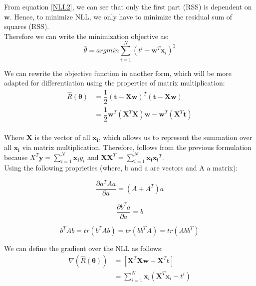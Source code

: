 \documentclass[reqno]{amsart}
\theoremstyle{definition}
\theoremstyle{remark}
\numberwithin{equation}{section}
\begin{document}
From equation \ref{NLL2}, we can see that only the first part (RSS) is dependent on $\mathbf{w}$. Hence, to minimize NLL, we only have to minimize the residual sum of squares (RSS). \\

Therefore we can write the minimization objective as: \\

\begin{equation}
    \hat{\theta} = argmin \sum_{i=1}^{N}(t^{i}-\mathbf{w}^{T}\mathbf{x}_{i})^2
\end{equation}

We can rewrite the objective function in another form, which will be more adapted for differentiation using the properties of matrix multiplication: \\

\begin{align}
    \hat{R}(\mathbf{\theta})&= \dfrac{1}{2}(\mathbf{t}-\mathbf{Xw})^T(\mathbf{t}-\mathbf{Xw})\\
    &= \dfrac{1}{2}\mathbf{w}^T(\mathbf{X}^T\mathbf{X})\mathbf{w} - \mathbf{w}^T(\mathbf{X}^T\mathbf{t})
\end{align}\\

Where $\mathbf{X}$ is the vector of all $\mathbf{x_i}$, which allows us to represent the summation over all $\mathbf{x_i}$ via matrix multiplication. Therefore, follows from the previous formulation because $X^T\mathbf{y}=\sum_{i=1}^{N}\mathbf{x_i} y_i$ and
$\mathbf{X}\mathbf{X}^T = \sum_{i=1}^{N}\mathbf{x_i} \mathbf{x_i}^T$. \\

Using the following proprieties (where, b and a are vectors and A a matrix):

\begin{equation}
    \dfrac{\partial a^T A a}{\partial a} = (A + A^T)a
\end{equation}

\begin{equation}
    \dfrac{\partial b^T a}{\partial a} = b
\end{equation}

\begin{equation}
    b^T A b = tr(b^T A b) =  tr(b b^T A) = tr(A b b^T)
\end{equation}

We can define the gradient over the NLL as follows: \\

\begin{align}
    \nabla(\hat{R}(\mathbf{\theta})) &= [\mathbf{X}^T\mathbf{Xw}-\mathbf{X}^T\mathbf{t}] \\
    &= \sum_{i=1}^{N} \mathbf{x}_i (\mathbf{X}^T\mathbf{x}_i - t^i)
\end{align}
\end{document}
